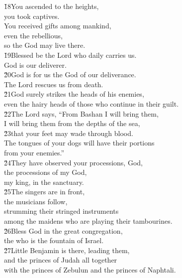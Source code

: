 \begin{poetry}
\poeml \v{18}You ascended to the heights, \\
\poemll    you took captives. \\
\poeml You received gifts among mankind, \\
\poemll    even the rebellious, \\
\poemlll       so the  God may live there. \\
\poeml \v{19}Blessed be the Lord who daily carries us. \\
\poemll    God is our deliverer. \\
\poeml \v{20}God is for us the God of our deliverance. \\
\poemll    The Lord  rescues us from death. \\
\poeml \v{21}God surely strikes the heads of his enemies, \\
\poemll    even the hairy heads of those who continue in their guilt. \\
\poeml \v{22}The Lord says, ``From Bashan I will bring them, \\
\poemll    I will bring them from the depths of the sea, \\
\poeml \v{23}that your feet may wade through blood. \\
\poeml The tongues of your dogs will have their portions \\
\poemll    from your enemies.'' \\
\poeml \v{24}They have observed your processions, God, \\
\poemll    the processions of my God, \\
\poemlll       my king, in the sanctuary. \\
\poeml \v{25}The singers are in front, \\
\poemll    the musicians follow, \\
\poemlll       strumming their stringed instruments \\
\poeml among the maidens who are playing their tambourines. \\
\poeml \v{26}Bless God in the great congregation, \\
\poemll    the  who is the fountain of Israel. \\
\poeml \v{27}Little Benjamin is there, leading them, \\
\poemll    and the princes of Judah all together \\
\poemlll       with the princes of Zebulun and the princes of Naphtali. \\

\end{poetry}
